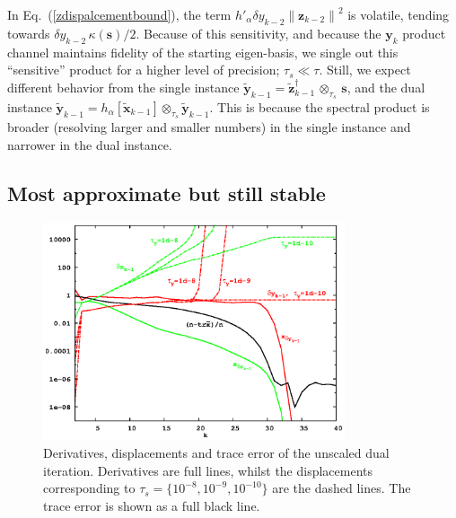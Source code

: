 \documentclass[letterpaper,twocolumn,amsmath,amsfont,amssymb,english,aps,jcp,preprintnumbers,groupaddress,nofootinbib,tightenlines,floatfix]{revtex4}
\newcommand{\mat}[1]{\boldsymbol{#1}}
\newcommand{\ots}{ {\scriptstyle \otimes}_{ \! \tau_s } }
\theoremstyle{plain}
\theoremstyle{remark}
\theoremstyle{plain}
\begin{document}
In Eq.~(\ref{zdispalcementbound}),  the term $h'_\alpha  \delta y_{k-2} { \lVert \mat{z}_{k-2} \rVert }^2$ is volatile, tending towards
$\delta y_{k-2} \, \kappa(\mat{s})/2$.  Because of this sensitivity, and because the $\mat{y}_k$ product channel maintains fidelity 
of the starting eigen-basis, we single out this ``sensitive'' product for a higher level of precision; $\tau_s \ll \tau$.
Still, we expect different behavior from the single instance $\widetilde{\mat{y}}_{k-1} = \widetilde{\mat{z}}^{\dagger}_{k-1} \, \ots \, \mat{s}$,
and the dual instance $\widetilde{\mat{y}}_{k-1} =  h_\alpha [\widetilde{\mat{x}}_{k-1}]  \ots \widetilde{\mat{y}}_{k-1} $.
This is because the spectral product is broader (resolving larger and smaller numbers) 
in the single instance and narrower in the dual instance.

\subsection{Most approximate but still stable}

\begin{figure}[h]
\includegraphics[width=3.5in]{fig_33_tube_cond_10_noscaling/33_nanotube_cond10_noscale_dual.eps}
\caption{Derivatives, displacements and trace error of the unscaled dual iteration.
Derivatives are full lines, whilst the displacements corresponding to $\tau_s=\{10^{-8}, 10^{-9}, 10^{-10}\}$
are the dashed lines.  The trace error is shown as a full black line. } \label{flow_noscale_dual}
\end{figure}
\end{document}
